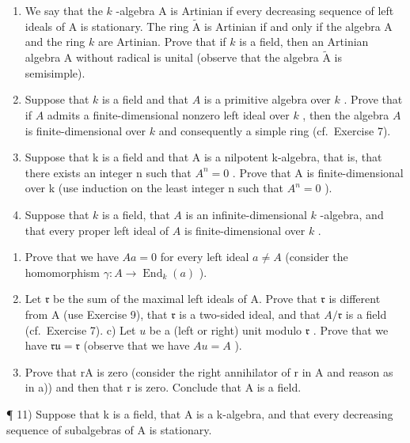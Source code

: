 \begin{enumerate}
\def\labelenumi{\arabic{enumi})}
\setcounter{enumi}{6}
\item
  We say that the \(k\) -algebra A is Artinian if every decreasing sequence of left ideals of A is stationary. The ring \(\widetilde{\mathrm{A}}\) is Artinian if and only if the algebra A and the ring \(k\) are Artinian. Prove that if \(k\) is a field, then an Artinian algebra A without radical is unital (observe that the algebra \(\widetilde{\mathrm{A}}\) is semisimple).
\item
  Suppose that \(k\) is a field and that \(A\) is a primitive algebra over \(k\) . Prove that if \(A\) admits a finite-dimensional nonzero left ideal over \(k\) , then the algebra \(A\) is finite-dimensional over \(k\) and consequently a simple ring (cf.~Exercise 7).
\item
  Suppose that k is a field and that A is a nilpotent k-algebra, that is, that there exists an integer n such that \(A^{n}=0\) . Prove that A is finite-dimensional over k (use induction on the least integer n such that \(A^{n}=0\) ).
\item
  Suppose that \(k\) is a field, that \(A\) is an infinite-dimensional \(k\) -algebra, and that every proper left ideal of \(A\) is finite-dimensional over \(k\) .
\end{enumerate}

\begin{enumerate}
\def\labelenumi{\alph{enumi})}
\item
  Prove that we have \(Aa = 0\) for every left ideal \(a \neq A\) (consider the homomorphism \(\gamma : A \to \operatorname{End}_{k}(a)\) ).
\item
  Let \(\mathfrak{r}\) be the sum of the maximal left ideals of A. Prove that \(\mathfrak{r}\) is different from A (use Exercise 9), that \(\mathfrak{r}\) is a two-sided ideal, and that \(A / \mathfrak{r}\) is a field (cf.~Exercise 7). c) Let \(u\) be a (left or right) unit modulo \(\mathfrak{r}\) . Prove that we have \(\mathfrak{ru} = \mathfrak{r}\) (observe that we have \(Au = A\) ).
\item
  Prove that rA is zero (consider the right annihilator of r in A and reason as in a)) and then that r is zero. Conclude that A is a field.
\end{enumerate}

¶ 11) Suppose that k is a field, that A is a k-algebra, and that every decreasing sequence of subalgebras of A is stationary.

